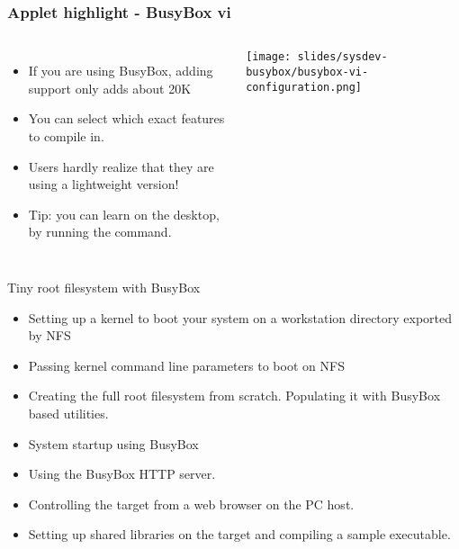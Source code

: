 \begin{frame}
  \frametitle{Applet highlight - BusyBox vi}
  \begin{columns}[T]
      \begin{itemize}
      \item If you are using BusyBox, adding  support only adds
        about 20K
      \item You can select which exact features to compile in.
      \item Users hardly realize that they are using a lightweight 
        version!
      \item Tip: you can learn  on the desktop, by running the 
        command.
      \end{itemize}
      \texttt{[image: slides/sysdev-busybox/busybox-vi-configuration.png]}
  \end{columns}
\end{frame}

\setuplabframe
{Tiny root filesystem with BusyBox}
{
  \begin{itemize}
  \item Setting up a kernel to boot your system on a workstation
    directory exported by NFS
  \item Passing kernel command line parameters to boot on NFS
  \item Creating the full root filesystem from scratch.
    Populating it with BusyBox based utilities.
  \item System startup using BusyBox 
  \item Using the BusyBox HTTP server.
  \item Controlling the target from a web browser on the PC host.
  \item Setting up shared libraries on the target and compiling
    a sample executable.
  \end{itemize}
}
